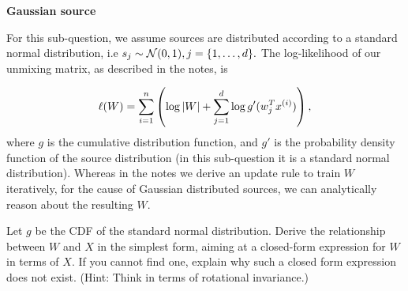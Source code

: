 \item {} \textbf{Gaussian source}

For this sub-question, we assume sources are distributed according to a standard normal distribution, i.e $s_j \sim \mathcal{N}(0,1), j=\{1,\ldots,{d}\}.$ The log-likelihood of our unmixing matrix, as described in the notes, is

$$\ell(W) = \sum_{i=1}^{n}\left(\log|W| + \sum_{j=1}^{d} \log g'(w_j^Tx^{(i)})\right),$$ where $g$ is the cumulative distribution function, and $g'$ is the probability density function of the source distribution (in this sub-question it is a standard normal distribution). Whereas in the notes we derive an update rule to train $W$ iteratively, for the cause of Gaussian distributed sources, we can analytically reason about the resulting $W$.

Let $g$ be the CDF of the standard normal distribution. Derive the relationship between $W$ and $X$ in the simplest form, aiming at a closed-form expression for $W$ in terms of $X$. If you cannot find one, explain why such a closed form expression does not exist. (Hint: Think in terms of rotational invariance.)
